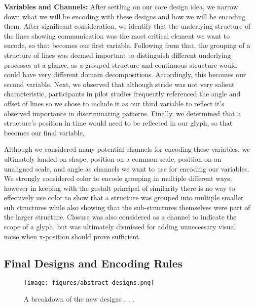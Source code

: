 \textbf{Variables and Channels:} After settling on our core design idea, we narrow down what we will be encoding with these designs and how we will be encoding them. After significant consideration, we identify that the underlying structure of the lines showing communication was the most critical element we want to encode, so that becomes our first variable. Following from that, the grouping of a structure of lines was deemed important to distinguish different underlying processes at a glance, as a grouped structure and continuous structure would could have very different domain decompositions. Accordingly, this becomes our second variable. Next, we observed that although stride was not very salient characteristic, participants in pilot studies frequently referenced the angle and offset of lines so we chose to include it as our third variable to reflect it's observed importance in discriminating patterns. Finally, we determined that a structure's position in time would need to be reflected in our glyph, so that becomes our final variable.

Although we considered many potential channels for encoding these variables, we ultimately landed on shape, position on a common scale, position on an unaligned scale, and angle as channels we want to use for encoding our variables. We strongly considered color to encode grouping in multiple different ways, however in keeping with the gestalt principal of similarity there is no way to effectively use color to show that a structure was grouped into multiple smaller sub structures while also showing that the sub-structures themselves were part of the larger structure. Closure was also considered as a channel to indicate the scope of a glyph, but was ultimately dismissed for adding unnecessary visual noise when x-position should prove sufficient.

\subsection{Final Designs and Encoding Rules}

\begin{figure*}
    \centering
    \texttt{[image: figures/abstract\_designs.png]}
    \caption{A breakdown of the new designs . . . }
    \label{fig:abstract_designs}
\end{figure*}

